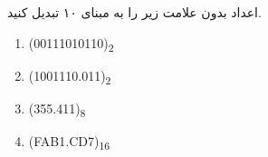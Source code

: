 
اعداد بدون علامت زیر را به مبنای ۱۰ تبدیل کنید.

\begin{latin}
	\begin{enumerate}
			\item 
			(00111010110)\textsubscript{2}
	
			\item 
			(1001110.011)\textsubscript{2}
			
			\item 
			(355.411)\textsubscript{8}
			
			\item 
			(FAB1.CD7)\textsubscript{16}
		\end{enumerate}
\end{latin}
